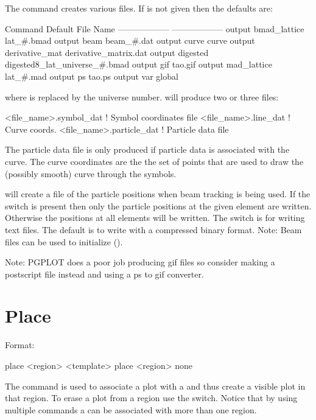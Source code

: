 \vskip 0.2in The  command creates various files. If  is
not given then the defaults are:
\begin{example}
  Command                         Default File Name
  ------------------              ------------------
  output bmad_lattice             lat_#.bmad
  output beam                     beam_#.dat
  output curve                    curve
  output derivative_mat           derivative_matrix.dat              
  output digested                 digested8_lat_universe_#.bmad
  output gif                      tao.gif
  output mad_lattice              lat_#.mad
  output ps                       tao.ps
  output var                      global%
\end{example}
where \vn{\#} is replaced by the universe number.  will produce two or three files: 
\begin{example}
  <file_name>.symbol_dat    ! Symbol coordinates file
  <file_name>.line_dat      ! Curve coords.
  <file_name>.particle_dat  ! Particle data file
\end{example}
The particle data file is only produced if particle
data is associated with the curve.
The curve coordinates are the the set of points that are used to draw the
(possibly smooth) curve through the symbols.

 will create a file of the particle positions when
beam tracking is being used. If the switch  is present then
only the particle positions at the given element are written. 
Otherwise the positions at all elements will be written. The
 switch is for writing text files. The default is to write
with a compressed binary format.  Note: Beam files can be used to
initialize \tao (). 

Note: PGPLOT does a poor job producing gif files so consider
making a postscript file instead and using a ps to gif converter.

\section{Place}
\label{s:place}

Format:
\begin{example}
  place <region> <template>
  place <region> none
\end{example}

\vskip 0.2in 
The  command is used to associate a  plot
with a  and thus create a visible plot in that region. To
erase a plot from a region use the  switch. Notice that by
using multiple  commands a  can be associated
with more than one region.

